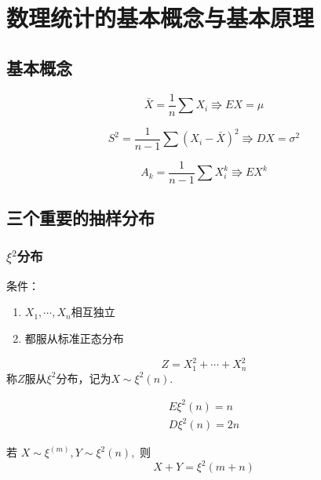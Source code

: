 \chapter{数理统计的基本概念与基本原理}

\section{基本概念}
\label{sec:基本概念}

\begin{definition}[样本均值]
    \[
        \bar{X} = \frac{1}{n} \sum X_i  \Rrightarrow EX = \mu
    \]
\end{definition}

\begin{definition}[样本方差]
    \[
        S^2 = \frac{1}{n-1} \sum \left(X_i - \bar{X}\right)^2 \Rrightarrow DX=\sigma^2
    \]
\end{definition}

\begin{definition}[$k$阶原点矩]
    \[
        A_k = \frac{1}{n-1} \sum X_i^k \Rrightarrow EX^k
    \]
\end{definition}

\section{三个重要的抽样分布}
\label{sec:三个重要的抽样分布}

\subsection{$\xi^2$分布}
\label{sub:_xi_2_分布}

\begin{definition}[$\xi^2$分布]
    条件：
    \begin{enumerate}
        \item $X_1, \cdots, X_n$相互独立
        \item 都服从标准正态分布
    \end{enumerate}
    \[
        Z = X_1^2+ \cdots + X_n^2
    \]
    称$Z$服从$\xi^2$分布，记为$X \sim \xi^2(n).$
\end{definition}

\begin{theorem}
    \begin{align}
        E \xi^2(n) = n\\
        D \xi^2(n) = 2n
    \end{align}

    若 $X \sim \xi^(m), Y \sim \xi^2(n),$ 则
    \[
        X + Y = \xi^2(m+n)
    \]
\end{theorem}

